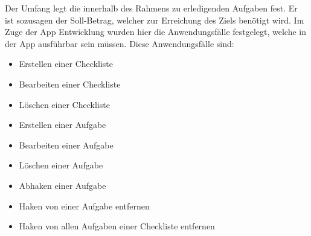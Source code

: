 Der Umfang legt die innerhalb des Rahmens zu erledigenden Aufgaben fest. Er ist sozusagen der Soll-Betrag, welcher zur Erreichung des Ziels benötigt wird. Im Zuge der App Entwicklung wurden hier die Anwendungsfälle festgelegt, welche in der App ausführbar sein müssen. Diese Anwendungsfälle sind:

\begin{itemize}
	\item Erstellen einer Checkliste
	\item Bearbeiten einer Checkliste
	\item Löschen einer Checkliste
	\item Erstellen einer Aufgabe
	\item Bearbeiten einer Aufgabe
	\item Löschen einer Aufgabe
	\item Abhaken einer Aufgabe
	\item Haken von einer Aufgabe entfernen
	\item Haken von allen Aufgaben einer Checkliste entfernen
\end{itemize}

